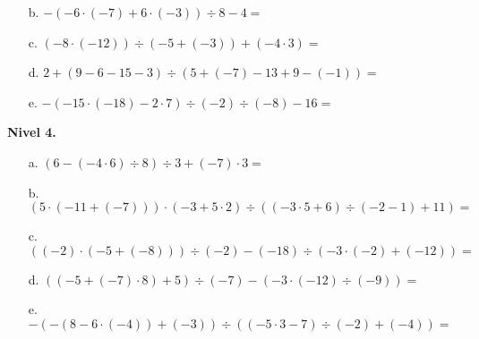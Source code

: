 \documentclass[spanish,letterpaper, 11pt, addpoints, answers]{exam}
\begin{document}
\begin{questions}
\begin{itemize}
\item[b.] $-(-6\cdot (-7)+6\cdot(-3))\div 8-4=$

\item[c.] $(-8\cdot (-12))\div (-5+(-3))+(-4\cdot 3)=$

\item[d.] $2+(9-6-15-3)\div (5+(-7)-13+9-(-1))=$ 

\item[e.] $-(-15\cdot (-18)-2\cdot 7)\div (-2)\div (-8)-16=$ 

\end{itemize}

\textbf{Nivel 4.}
\begin{itemize}
\item[a.] $(6-(-4\cdot 6)\div 8)\div 3+(-7)\cdot 3=$

\item[b.] $(5\cdot (-11+(-7)))\cdot(-3+5\cdot 2)\div((-3\cdot 5+6)\div (-2-1)+11)=$

\item[c.] $((-2)\cdot (-5+(-8)))\div (-2)-(-18)\div(-3\cdot (-2)+(-12))=$

\item[d.] $((-5+(-7)\cdot 8)+5)\div (-7)-(-3\cdot (-12 )\div (-9))=$

\item[e.] $-(-(8-6\cdot (-4))+(-3))\div ((-5\cdot 3-7)\div(-2)+(-4))=$

\end{itemize}
\end{questions}
\end{document}
